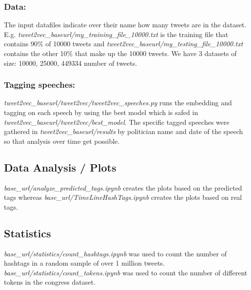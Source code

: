 \documentclass[10pt,conference,compsocconf]{IEEEtran}
\begin{document}
\subsubsection{Data:}
 The input datafiles indicate over their name how many tweets are in the dataset. E.g. \textit{tweet2vec\_baseurl/my\_training\_file\_10000.txt} is the training file that contains 90\% of 10000 tweets and \textit{tweet2vec\_baseurl/my\_testing\_file\_10000.txt} contains the other 10\% that make up the 10000 tweets. We have 3 datasets of size: 10000, 25000, 449334 number of tweets. 

\subsubsection{Tagging speeches:}
\textit{tweet2vec\_baseurl/tweet2vec/tweet2vec\_speeches.py} runs the embedding and tagging on each speech by using the best model which is safed in \textit{tweet2vec\_baseurl/tweet2vec/best\_model}. The specific tagged speeches were gathered in \textit{tweet2vec\_baseurl/results} by politician name and date of the speech so that analysis over time get possible.

\subsection{Data Analysis / Plots}
 \textit{base\_url/analyze\_predicted\_tags.ipynb} creates the plots based on the predicted tags whereas  \textit{base\_url/TimeLineHashTags.ipynb} creates the plots based on real tags. 
 
\subsection{Statistics}
\textit{base\_url/statistics/count\_hashtags.ipynb} was used to count the number of hashtags in a random sample of over 1 million tweets. 
\textit{base\_url/statistics/count\_tokens.ipynb} was used to count the number of different tokens in the congress dataset. 






\end{document}
